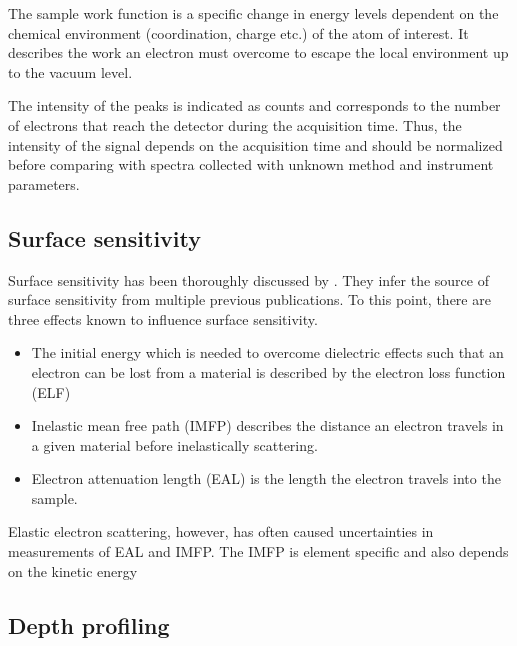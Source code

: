 The sample work function is a specific change in energy levels dependent on the chemical environment (coordination, charge etc.) of the atom of interest. It describes the work an electron must overcome to escape the local environment up to the vacuum level.

The intensity of the peaks is indicated as counts and corresponds to the number of electrons that reach the detector during the acquisition time. Thus, the intensity of the signal depends on the acquisition time and should be normalized before comparing with spectra collected with unknown method and instrument parameters. 



\subsection{Surface sensitivity}

Surface sensitivity has been thoroughly discussed by \cite{powell_surface_2009}. They infer the source of surface sensitivity from multiple previous publications. To this point, there are three effects known to influence surface sensitivity.
\begin{itemize}
\item The initial energy which is needed to overcome dielectric effects such that an electron can be lost from a material is described by the electron loss function (ELF)
\item Inelastic mean free path (IMFP) describes the distance an electron travels in a given material before inelastically scattering.
\item Electron attenuation length (EAL) is the length the electron travels into the sample.

\end{itemize}

Elastic electron scattering, however, has often caused uncertainties in measurements of EAL and IMFP. 
The IMFP is element specific and also depends on the kinetic energy 


\subsection{Depth profiling}

